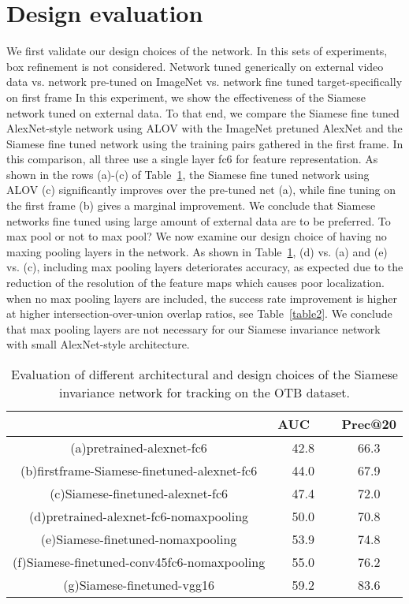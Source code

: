 \documentclass[10pt,twocolumn,letterpaper]{article}
\begin{document}
\section{Design evaluation}
We first validate our design choices of the network. In this sets of experiments, box refinement is not considered. Network tuned generically on external video data vs. network pre-tuned on ImageNet vs. network fine tuned target-specifically on first frame In this experiment, we show the effectiveness of the Siamese network tuned on external data. To that end, we compare the Siamese fine tuned AlexNet-style network using ALOV with the ImageNet pretuned AlexNet and the Siamese
fine tuned network using the training pairs gathered in the first frame. In this comparison, all three use a single layer fc6 for feature representation. As shown in the rows (a)-(c) of
Table~\ref{table1}, the Siamese fine tuned network using ALOV (c) significantly improves over the pre-tuned net (a), while fine tuning on the first frame (b) gives a marginal improvement. We conclude that Siamese networks fine tuned using large amount of external data are to be preferred.
To max pool or not to max pool? We now examine our design choice of having no maxing pooling layers in the network. As shown in Table~\ref{table1}, (d) vs. (a) and (e) vs. (c), including max pooling layers deteriorates accuracy, as expected due to the reduction of the resolution of the feature maps which causes poor localization. when no max pooling layers are included, the success rate
improvement is higher at higher intersection-over-union overlap ratios, see Table~\ref{table2}. We conclude that max pooling layers are not necessary for our Siamese invariance network with small AlexNet-style architecture.
\begin{table}[h]%
	\centering 
	\caption{Evaluation of different architectural and design
		choices of the Siamese invariance network for tracking on
		the OTB dataset.}\label{table1}
	
	\tabcolsep 0.00000008in 
	\begin{tabular} {ccc}
		\hline
	&	AUC ~~& Prec@20\\
	\hline 
		 (a)pretrained-alexnet-fc6& 42.8& 66.3\\
		 (b)firstframe-Siamese-finetuned-alexnet-fc6& 44.0 &67.9\\
	     (c)Siamese-finetuned-alexnet-fc6& 47.4 &72.0\\
		 (d)pretrained-alexnet-fc6-nomaxpooling& 50.0 &70.8\\
		 (e)Siamese-finetuned-nomaxpooling& 53.9& 74.8\\
		 (f)Siamese-finetuned-conv45fc6-nomaxpooling& 55.0 &76.2\\
		 (g)Siamese-finetuned-vgg16& 59.2& 83.6\\
			\hline
	\end{tabular}
\end{table}
\end{document}
